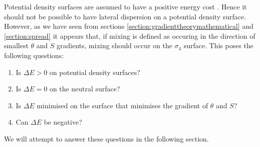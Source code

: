 Potential density surfaces are assumed to have a positive energy cost \citep{McDougall1987}. Hence it should not be possible to have lateral dispersion on a potential density surface. However, as we have seen from sections \ref{section:gradienttheorymathematical} and \ref{section:spread} it appears that, if mixing is defined as occuring in the direction of smallest $\theta$ and $S$ gradients, mixing should occur on the $\sigma_4$ surface. This poses the following questions:

\begin{enumerate}
    \item Is $\Delta E>0$ on potential density surfaces?
    \item Is $\Delta E = 0$ on the neutral surface?
    \item Is $\Delta E$ minimised on the surface that minimises the gradient of $\theta$ and $S$?
    \item Can $\Delta E$ be negative?
\end{enumerate}

We will attempt to answer these questions in the following section. 